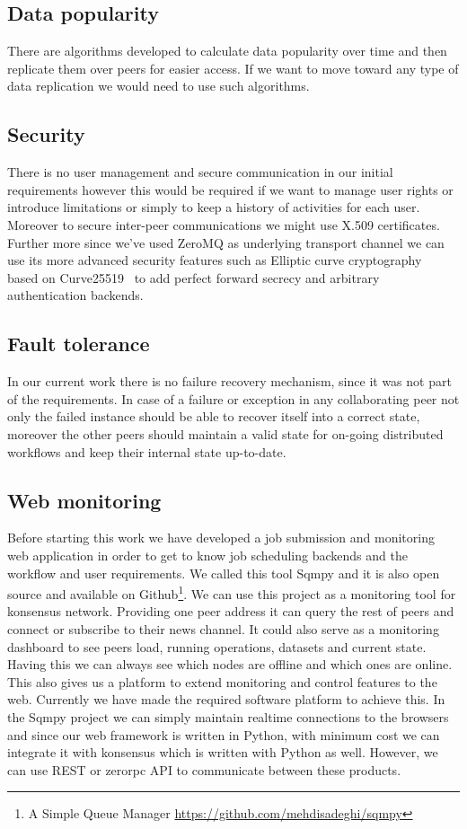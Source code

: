 \subsection{Data popularity}
There are algorithms developed to calculate data popularity over time and then replicate them over peers for easier access. If we want to 
move toward any type of data replication we would need to use such algorithms.

\subsection{Security}
There is no user management and secure communication in our initial requirements however this would be required if we want to manage user
rights or introduce limitations or simply to keep a history of activities for each user. Moreover to secure inter-peer communications 
we might use X.509 certificates. Further more since we've used ZeroMQ as underlying transport channel we can use its more advanced
security features such as Elliptic curve cryptography~\cite{Curve} based on Curve25519~\cite{Curve25519} to add perfect forward secrecy and 
arbitrary authentication backends.

\subsection{Fault tolerance}
In our current work there is no failure recovery mechanism, since it was not part of the requirements. In case of a failure or exception in any 
collaborating peer not only the failed instance should be able to recover itself into a correct state, moreover the other peers should maintain
a valid state for on-going distributed workflows and keep their internal state up-to-date.

\subsection{Web monitoring}
Before starting this work we have developed a job submission and monitoring web application in order to get to know 
job scheduling backends and the workflow and user requirements. 
We called this tool Sqmpy and it is also open source and available 
on Github\footnote{A Simple Queue Manager \url{https://github.com/mehdisadeghi/sqmpy}}.
We can use this project as a monitoring tool for konsensus network.
Providing one peer address it can query the rest of peers and connect or 
subscribe to their news channel. It could also serve as a monitoring dashboard to see peers load, running operations,
datasets and current state.
Having this we can always see which nodes are
offline and which ones are online. This also gives us a platform to extend
monitoring and control features to the web. Currently we have made the 
required software platform to achieve this. In the Sqmpy project we can simply maintain realtime connections to the browsers and since
our web framework is written in Python, with minimum cost we can integrate it with konsensus which is written with Python as well.
However, we can use REST or zerorpc API to communicate between these products.